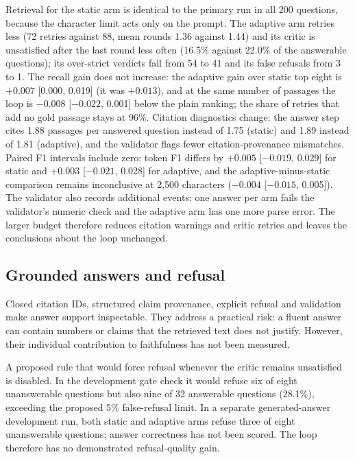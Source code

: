 Retrieval for the static arm is identical to the primary run in all 200 questions, because the character limit acts only on the prompt. The adaptive arm retries less (72 retries against 88, mean rounds 1.36 against 1.44) and its critic is unsatisfied after the last round less often (16.5\% against 22.0\% of the answerable questions); its over-strict verdicts fall from 54 to 41 and its false refusals from 3 to 1. The recall gain does not increase: the adaptive gain over static top eight is $+0.007$ [0.000, 0.019] (it was $+0.013$), and at the same number of passages the loop is $-0.008$ [$-0.022$, 0.001] below the plain ranking; the share of retries that add no gold passage stays at 96\%. Citation diagnostics change: the answer step cites 1.88 passages per answered question instead of 1.75 (static) and 1.89 instead of 1.81 (adaptive), and the validator flags fewer citation-provenance mismatches. Paired F1 intervals include zero: token F1 differs by $+0.005$ [$-0.019$, 0.029] for static and $+0.003$ [$-0.021$, 0.028] for adaptive, and the adaptive-minus-static comparison remains inconclusive at 2{,}500 characters ($-0.004$ [$-0.015$, 0.005]). The validator also records additional events: one answer per arm fails the validator's numeric check and the adaptive arm has one more parse error. The larger budget therefore reduces citation warnings and critic retries and leaves the conclusions about the loop unchanged.


\subsection{Grounded answers and refusal}
Closed citation IDs, structured claim provenance, explicit refusal and validation make answer support inspectable. They address a practical risk: a fluent answer can contain numbers or claims that the retrieved text does not justify. However, their individual contribution to faithfulness has not been measured.

A proposed rule that would force refusal whenever the critic remains unsatisfied is disabled. In the development gate check it would refuse six of eight unanswerable questions but also nine of 32 answerable questions (28.1\%), exceeding the proposed 5\% false-refusal limit. In a separate generated-answer development run, both static and adaptive arms refuse three of eight unanswerable questions; answer correctness has not been scored. The loop therefore has no demonstrated refusal-quality gain.

